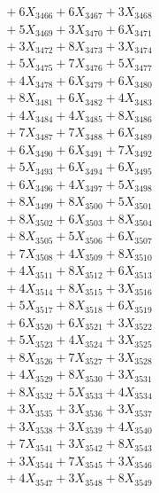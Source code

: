 \documentclass[a4paper,10pt]{article}
\begin{document}
{\begin{align}
&\;  + 6 X_{3466} + 6 X_{3467} + 3 X_{3468} \\[0.3ex]
&\;  + 5 X_{3469} + 3 X_{3470} + 6 X_{3471} \\[0.3ex]
&\;  + 3 X_{3472} + 8 X_{3473} + 3 X_{3474} \\[0.3ex]
&\;  + 5 X_{3475} + 7 X_{3476} + 5 X_{3477} \\[0.3ex]
&\;  + 4 X_{3478} + 6 X_{3479} + 6 X_{3480} \\[0.3ex]
&\;  + 8 X_{3481} + 6 X_{3482} + 4 X_{3483} \\[0.3ex]
&\;  + 4 X_{3484} + 4 X_{3485} + 8 X_{3486} \\[0.3ex]
&\;  + 7 X_{3487} + 7 X_{3488} + 6 X_{3489} \\[0.5ex]\allowbreak
&\;  + 6 X_{3490} + 6 X_{3491} + 7 X_{3492} \\[0.3ex]
&\;  + 5 X_{3493} + 6 X_{3494} + 6 X_{3495} \\[0.3ex]
&\;  + 6 X_{3496} + 4 X_{3497} + 5 X_{3498} \\[0.3ex]
&\;  + 8 X_{3499} + 8 X_{3500} + 5 X_{3501} \\[0.3ex]
&\;  + 8 X_{3502} + 6 X_{3503} + 8 X_{3504} \\[0.3ex]
&\;  + 8 X_{3505} + 5 X_{3506} + 6 X_{3507} \\[0.3ex]
&\;  + 7 X_{3508} + 4 X_{3509} + 8 X_{3510} \\[0.3ex]
&\;  + 4 X_{3511} + 8 X_{3512} + 6 X_{3513} \\[0.3ex]
&\;  + 4 X_{3514} + 8 X_{3515} + 3 X_{3516} \\[0.3ex]
&\;  + 5 X_{3517} + 8 X_{3518} + 6 X_{3519} \\[0.5ex]\allowbreak
&\;  + 6 X_{3520} + 6 X_{3521} + 3 X_{3522} \\[0.3ex]
&\;  + 5 X_{3523} + 4 X_{3524} + 3 X_{3525} \\[0.3ex]
&\;  + 8 X_{3526} + 7 X_{3527} + 3 X_{3528} \\[0.3ex]
&\;  + 4 X_{3529} + 8 X_{3530} + 3 X_{3531} \\[0.3ex]
&\;  + 8 X_{3532} + 5 X_{3533} + 4 X_{3534} \\[0.3ex]
&\;  + 3 X_{3535} + 3 X_{3536} + 3 X_{3537} \\[0.3ex]
&\;  + 3 X_{3538} + 3 X_{3539} + 4 X_{3540} \\[0.3ex]
&\;  + 7 X_{3541} + 3 X_{3542} + 8 X_{3543} \\[0.3ex]
&\;  + 3 X_{3544} + 7 X_{3545} + 3 X_{3546} \\[0.3ex]
&\;  + 4 X_{3547} + 3 X_{3548} + 8 X_{3549} \\[0.5ex]\allowbreak

\end{align}}
\end{document}
